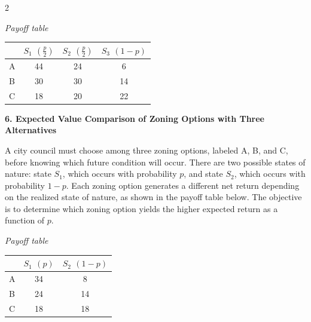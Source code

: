 \documentclass[12pt]{article}
\newcommand{\SubsectionBox}[1]{%
	\noindent\colorbox{gray!30}{%
		\parbox{\linewidth}{\textbf{#1}}%
	}\par\vspace{0.35cm}%
}
\begin{document}
\begin{multicols}{2}
		\begin{center}
			\textit{Payoff table} \\
			\begin{tabular}{l c c c}
				\hline
				& $S_1$ $\left(\frac{p}{2}\right)$ & $S_2$ $\left(\frac{p}{2}\right)$ & $S_3$ $(1-p)$ \\
				\hline
				A & 44 & 24 & 6 \\
				B & 30 & 30 & 14 \\
				C & 18 & 20 & 22 \\
				\hline
			\end{tabular}
		\end{center}
		
		\vspace{0.25cm}
		\SubsectionBox{6. Expected Value Comparison of Zoning Options with Three Alternatives}\vspace{-0.25cm}
		A city council must choose among three zoning options, labeled A, B, and C, before knowing which future condition will occur.
		There are two possible states of nature: state $S_1$, which occurs with probability $p$, and state $S_2$, which occurs with probability $1-p$.
		Each zoning option generates a different net return depending on the realized state of nature, as shown in the payoff table below.
		The objective is to determine which zoning option yields the higher expected return as a function of $p$.
		
		\begin{center}
			\textit{Payoff table} \\
			\begin{tabular}{l c c}
				\hline
				& $S_1$ $(p)$ & $S_2$ $(1-p)$ \\
				\hline
				A & 34 & 8 \\
				B & 24 & 14 \\
				C & 18 & 18 \\
				\hline
			\end{tabular}
		\end{center}
		
	\end{multicols}
	
\end{document}
